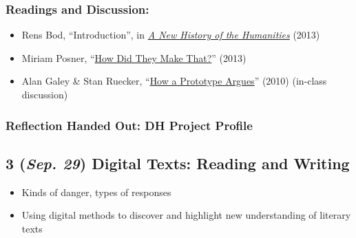 \documentclass[11pt]{article}
\begin{document}
\subsubsection*{Readings and Discussion:}
\label{sec:org0207d6c}
\begin{itemize}
\item Rens Bod, ``Introduction'', in \emph{\href{https://librarysearch.library.utoronto.ca/discovery/fulldisplay?docid=alma991106146656606196\&context=L\&vid=01UTORONTO\_INST:UTORONTO\&lang=en\&search\_scope=UTL\_AND\_CI\&adaptor=Local\%20Search\%20Engine\&tab=Everything\&query=any,contains,A\%20New\%20History\%20of\%20the\%20Humanities:\%20The\%20Search\%20for\%20Principles\%20and\%20Patterns\%20from\%20Antiquity\%20to\%20the\%20Present\&offset=0}{A New History of the Humanities}} (2013)
\item Miriam Posner, “\href{http://miriamposner.com/blog/how-did-they-make-that/}{How Did They Make That?}” (2013)
\item Alan Galey \& Stan Ruecker, “\href{https://doi.org/10.1093/llc/fqq021}{How a Prototype Argues}” (2010) (in-class discussion)
\end{itemize}
\subsubsection*{Reflection Handed Out: DH Project Profile}
\label{sec:org1f4cf8f}
\subsection*{3 (\textit{Sep. 29}) Digital Texts: Reading and Writing}
\label{sec:org0db9d76}
\begin{itemize}
\item Kinds of danger, types of responses
\item Using digital methods to discover and highlight new understanding of literary texts
\end{itemize}
\end{document}

